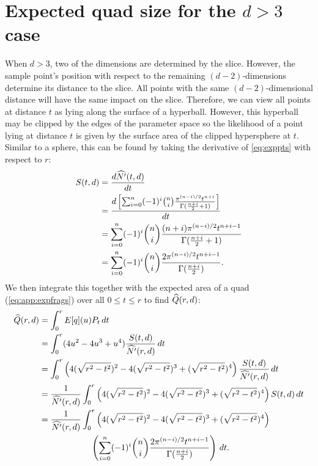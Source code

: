 \section{Expected quad size for the $d>3$ case}


When $d>3$, two of the dimensions are determined by the slice. However, the
sample point's position with respect to the remaining $(d-2)$-dimensions 
determine its distance to the slice.  All points with the same 
$(d-2)$-dimensional distance will have the same impact on the slice.
Therefore, we can view all points at distance $t$ as lying along the surface 
of a hyperball.  However, this hyperball may be clipped by the edges of the
parameter space so the likelihood of a point lying at distance $t$ is given
by the surface area of the clipped hypersphere at $t$.  Similar to a sphere,
this can be found by taking the derivative of \autoref{eq:exppts} with 
respect to $r$:
\begin{align*}
 S(t,d) 
   &= \frac{d \widehat{N'}(t, d)}{d t} \\
   &= \frac{d \left[
    \sum_{i=0}^{n} (-1)^{i} {n \choose i}
         \frac{\pi^{(n-i)/2}t^{n+i}}{\Gamma(\frac{n+i}{2} + 1)} 
 \right]}{dt} \\
   &= \sum_{i=0}^{n} (-1)^{i} {n \choose i}
         \frac{(n+i)\pi^{(n-i)/2}t^{n+i-1}}{\Gamma(\frac{n+i}{2} + 1)} \\
   &= \sum_{i=0}^{n} (-1)^{i} {n \choose i}
         \frac{2\pi^{(n-i)/2}t^{n+i-1}}{\Gamma(\frac{n+i}{2})} 
         \text{.}
\end{align*}
We then integrate this
together with the expected area of a quad (\autoref{eq:app:expfrags}) over
all $0 \le t \le r$ to find $\widehat{Q}(r,d)$:
\begin{align*}
\widehat{Q}(r,d) &= \int_0^r E[q](u) P_t \, dt \\
     &= \int_0^r (4u^2 - 4u^3 + u^4)
        \frac{S(t,d)}{\widehat{N'}(r, d)} \, dt \\
     &= \int_0^r 
        \left(4(\sqrt{r^2-t^2})^2 - 4(\sqrt{r^2-t^2})^3 + (\sqrt{r^2-t^2})^4\right)
        \frac{S(t,d)}{\widehat{N'}(r, d)} \, dt \\
     &= \frac{1}{\widehat{N'}(r, d)} \int_0^r 
        \left(4(\sqrt{r^2-t^2})^2 - 4(\sqrt{r^2-t^2})^3 + (\sqrt{r^2-t^2})^4\right)
        S(t,d) \, dt \\
     &= \frac{1}{\widehat{N'}(r, d)} \int_0^r 
        \left(4(\sqrt{r^2-t^2})^2 - 4(\sqrt{r^2-t^2})^3 + (\sqrt{r^2-t^2})^4\right) \\
     &\qquad\qquad\qquad
       \left(
           \sum_{i=0}^{n} (-1)^{i} {n \choose i}
               \frac{2\pi^{(n-i)/2}t^{n+i-1}}{\Gamma(\frac{n+i}{2})} 
        \right) \, dt 
        \text{.}
\end{align*}

